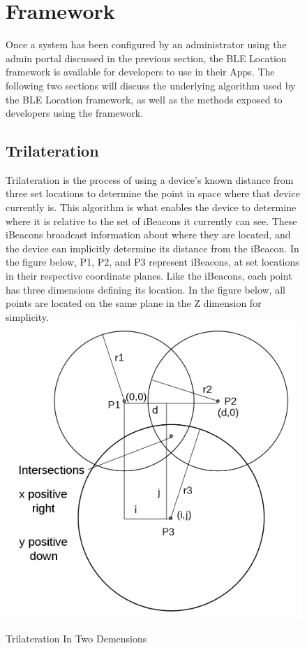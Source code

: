 \begin{figure}
\section{Framework}
Once a system has been configured by an administrator using the admin portal discussed in the previous section, the BLE Location framework is available for developers to use in their Apps.  The following two sections will discuss the underlying algorithm used by the BLE Location framework, as well as the methods exposed to developers using the framework.
\subsection{Trilateration}
Trilateration is the process of using a device's known distance from three set locations to determine the point in space where that device currently is.  This algorithm is what enables the device to determine where it is relative to the set of iBeacons it currently can see.  These iBeacons broadcast information about where they are located, and the device can implicitly determine its distance from the iBeacon.  In the figure below, P1, P2, and P3 represent iBeacons, at set locations in their respective coordinate planes.  Like the iBeacons, each point has three dimensions defining its location.  In the figure below, all points are located on the same plane in the Z dimension for simplicity.\\
\includegraphics[width=.55\textwidth]{images/tri.png}
\caption{Trilateration In Two Demensions}
\end{figure}
